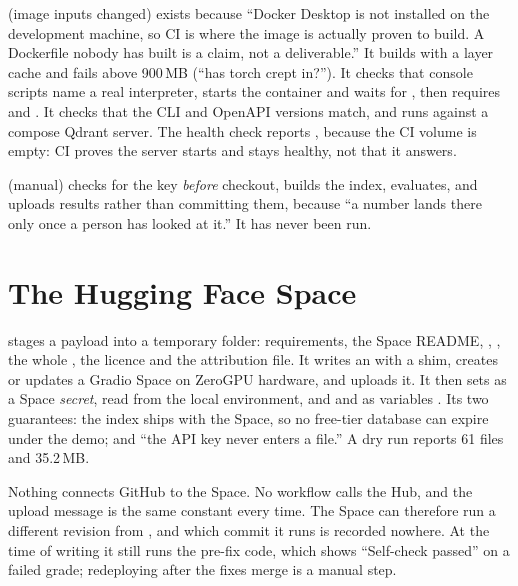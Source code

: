 \textbf{} (image inputs changed) exists because ``Docker Desktop is not installed on the development machine, so CI is where the image is actually proven to build. A Dockerfile nobody has built is a claim, not a deliverable.'' It builds with a layer cache and fails above 900\,MB (``has torch crept in?''). It checks that console scripts name a real interpreter, starts the container and waits for , then requires  and . It checks that the CLI and OpenAPI versions match, and runs  against a compose Qdrant server. The health check reports , because the CI volume is empty: CI proves the server starts and stays healthy, not that it answers.

\textbf{} (manual) checks for the key \emph{before} checkout, builds the index, evaluates, and uploads results rather than committing them, because ``a number lands there only once a person has looked at it.'' It has never been run.

\section{The Hugging Face Space}
\label{sec:space-deploy}

 stages a payload into a temporary folder: requirements, the Space README, , , the whole , the licence and the attribution file. It writes an  with a  shim, creates or updates a Gradio Space on ZeroGPU hardware, and uploads it. It then sets  as a Space \emph{secret}, read from the local environment, and  and  as variables . Its two guarantees: the index ships with the Space, so no free-tier database can expire under the demo; and ``the API key never enters a file.'' A dry run reports 61 files and 35.2\,MB.

\begin{inferred}
Nothing connects GitHub to the Space. No workflow calls the Hub, and the upload message is the same constant every time. The Space can therefore run a different revision from , and which commit it runs is recorded nowhere. At the time of writing it still runs the pre-fix code, which shows ``Self-check passed'' on a failed grade; redeploying after the fixes merge is a manual step.
\end{inferred}

